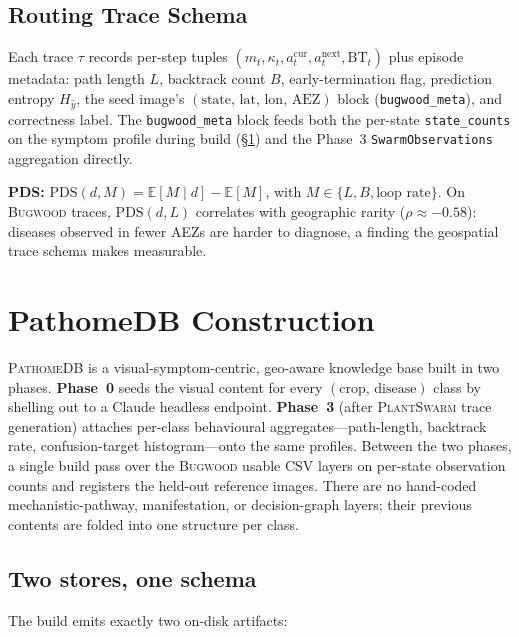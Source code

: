 \documentclass[11pt,twocolumn]{article}
\newcommand{\plantswarm}{\textsc{PlantSwarm}\xspace}
\newcommand{\pathomedb}{\textsc{PathomeDB}\xspace}
\newcommand{\bugwood}{\textsc{Bugwood}\xspace}
\begin{document}
\subsection{Routing Trace Schema}

Each trace $\tau$ records per-step tuples
$(m_t, \kappa_t, a^\text{cur}_t, a^\text{next}_t,
\text{BT}_t)$ plus episode metadata: path
length $L$, backtrack count $B$,
early-termination flag, prediction entropy
$H_{\hat{y}}$, the seed image's
$(\text{state},\,\text{lat},\,\text{lon},
\,\mathrm{AEZ})$ block (\texttt{bugwood\_meta}),
and correctness label. The \texttt{bugwood\_meta}
block feeds both the per-state \texttt{state\_counts}
on the symptom profile during build
(\S\ref{sec:pathomedb}) and the Phase~3
\texttt{SwarmObservations} aggregation directly.

\textbf{PDS:} $\mathrm{PDS}(d, M){=}
\mathbb{E}[M \mid d] - \mathbb{E}[M]$,
with $M \in \{L, B, \text{loop rate}\}$.
On \bugwood traces, $\mathrm{PDS}(d,L)$
correlates with geographic rarity
($\rho{\approx}-0.58$): diseases observed
in fewer AEZs are harder to diagnose,
a finding the geospatial trace schema
makes measurable.

\section{PathomeDB Construction}
\label{sec:pathomedb}

\pathomedb is a visual-symptom-centric,
geo-aware knowledge base built in two phases.
\textbf{Phase~0} seeds the visual content for
every $(\text{crop},\,\text{disease})$ class
by shelling out to a Claude headless endpoint.
\textbf{Phase~3} (after \plantswarm trace
generation) attaches per-class behavioural
aggregates---path-length, backtrack rate,
confusion-target histogram---onto the same
profiles. Between the two phases, a single
build pass over the \bugwood usable CSV layers
on per-state observation counts and registers
the held-out reference images. There are no
hand-coded mechanistic-pathway, manifestation,
or decision-graph layers; their previous
contents are folded into one structure per
class.

\subsection{Two stores, one schema}

The build emits exactly two on-disk artifacts:
\end{document}
